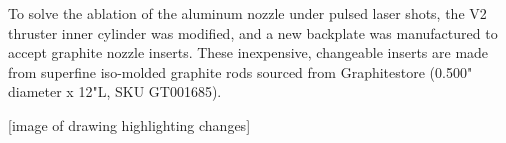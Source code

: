     To solve the ablation of the aluminum nozzle under pulsed laser shots, the V2 thruster inner cylinder was modified, and a new backplate was manufactured to accept graphite nozzle inserts. These inexpensive, changeable inserts are made from superfine iso-molded graphite rods sourced from Graphitestore (0.500" diameter x 12"L, SKU GT001685).

    [image of drawing highlighting changes]




    